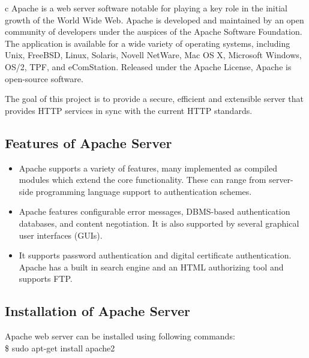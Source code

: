 c
\noindent Apache is a web server software notable for playing a key role in the initial 
growth of the World Wide Web. Apache is developed and maintained by an 
open community of developers under the auspices of the Apache Software 
Foundation. The application is available for a wide variety of operating 
systems, including Unix, FreeBSD, Linux, Solaris, Novell NetWare, Mac OS X, 
Microsoft Windows, OS/2, TPF, and eComStation. Released under the Apache 
License, Apache is open-source software.

The goal of this project is to provide a secure, efficient and extensible 
server that provides HTTP services in sync with the current HTTP standards.
\subsection{Features of Apache Server}
\begin{itemize}
\item Apache supports a variety of features, many implemented as compiled 
modules which extend the core functionality. These can range from 
server-side programming language support to authentication schemes. 
\item Apache features configurable error messages, DBMS-based 
authentication databases, and content negotiation. It is also supported 
by several graphical user interfaces (GUIs).
\item It supports password authentication and digital certificate 
authentication. Apache has a built in search engine and an HTML authorizing 
tool and supports FTP.
\end{itemize}

\subsection{Installation of Apache Server}
Apache web server can be installed using following commands:\\

\hspace{4pt} \$ sudo apt-get install apache2
\newpage
